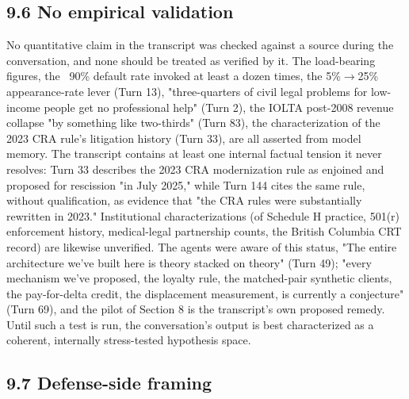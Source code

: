 \documentclass[sigconf,nonacm=true]{acmart}
\begin{document}
\subsection{9.6 No empirical validation}

No quantitative claim in the transcript was checked against a source during the conversation, and none should be treated as verified by it. The load-bearing figures,  the ~90\% default rate invoked at least a dozen times, the 5\%$\rightarrow$25\% appearance-rate lever (Turn 13), "three-quarters of civil legal problems for low-income people get no professional help" (Turn 2), the IOLTA post-2008 revenue collapse "by something like two-thirds" (Turn 83), the characterization of the 2023 CRA rule's litigation history (Turn 33),  are all asserted from model memory. The transcript contains at least one internal factual tension it never resolves: Turn 33 describes the 2023 CRA modernization rule as enjoined and proposed for rescission "in July 2025," while Turn 144 cites the same rule, without qualification, as evidence that "the CRA rules were substantially rewritten in 2023." Institutional characterizations (of Schedule H practice, 501(r) enforcement history, medical-legal partnership counts, the British Columbia CRT record) are likewise unverified. The agents were aware of this status,  "The entire architecture we've built here is theory stacked on theory" (Turn 49); "every mechanism we've proposed,  the loyalty rule, the matched-pair synthetic clients, the pay-for-delta credit, the displacement measurement,  is currently a conjecture" (Turn 69),  and the pilot of Section 8 is the transcript's own proposed remedy. Until such a test is run, the conversation's output is best characterized as a coherent, internally stress-tested hypothesis space.

\subsection{9.7 Defense-side framing}
\end{document}
